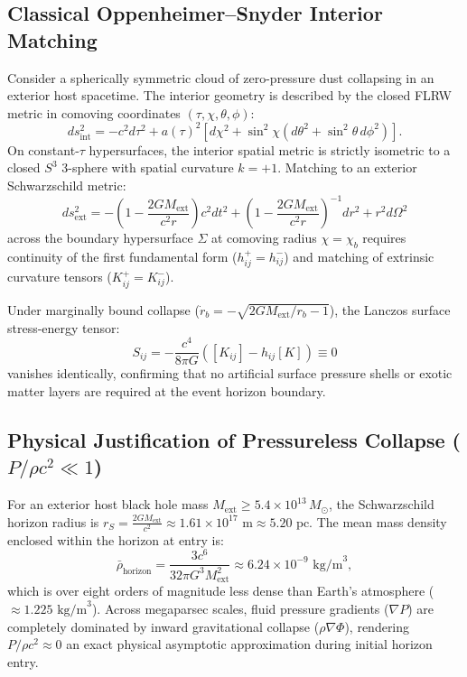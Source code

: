 \documentclass[11pt,a4paper]{article}
\theoremstyle{definition}
\begin{document}
\subsection{Classical Oppenheimer--Snyder Interior Matching}\label{sec:os_matching}
Consider a spherically symmetric cloud of zero-pressure dust collapsing in an exterior host spacetime. The interior geometry is described by the closed FLRW metric in comoving coordinates $(\tau, \chi, \theta, \phi)$:
\begin{equation}\label{eq:flrw_int}
    ds^2_{\text{int}} = -c^2 d\tau^2 + a(\tau)^2 \left[ d\chi^2 + \sin^2\chi \left( d\theta^2 + \sin^2\theta \, d\phi^2 \right) \right].
\end{equation}
On constant-$\tau$ hypersurfaces, the interior spatial metric is strictly isometric to a closed $S^3$ 3-sphere with spatial curvature $k=+1$. Matching to an exterior Schwarzschild metric:
\begin{equation}\label{eq:schwarzschild}
    ds^2_{\text{ext}} = -\left(1 - \frac{2GM_{\text{ext}}}{c^2 r}\right) c^2 dt^2 + \left(1 - \frac{2GM_{\text{ext}}}{c^2 r}\right)^{-1} dr^2 + r^2 d\Omega^2
\end{equation}
across the boundary hypersurface $\Sigma$ at comoving radius $\chi = \chi_b$ requires continuity of the first fundamental form ($h_{ij}^+ = h_{ij}^-$) and matching of extrinsic curvature tensors ($K_{ij}^+ = K_{ij}^-$).

Under marginally bound collapse ($\dot{r}_b = -\sqrt{2GM_{\text{ext}}/r_b - 1}$), the Lanczos surface stress-energy tensor:
\begin{equation}\label{eq:lanczos}
    S_{ij} = -\frac{c^4}{8\pi G} \left( [K_{ij}] - h_{ij} [K] \right) \equiv 0
\end{equation}
vanishes identically, confirming that no artificial surface pressure shells or exotic matter layers are required at the event horizon boundary.

\subsection{Physical Justification of Pressureless Collapse ($P/\rho c^2 \ll 1$)}\label{sec:dust_justification}
For an exterior host black hole mass $M_{\text{ext}} \ge 5.4 \times 10^{13} \, M_\odot$, the Schwarzschild horizon radius is $r_S = \frac{2GM_{\text{ext}}}{c^2} \approx 1.61 \times 10^{17} \text{ m} \approx 5.20 \text{ pc}$. The mean mass density enclosed within the horizon at entry is:
\begin{equation}\label{eq:horizon_density}
    \bar{\rho}_{\text{horizon}} = \frac{3 c^6}{32\pi G^3 M_{\text{ext}}^2} \approx 6.24 \times 10^{-9} \text{ kg/m}^3,
\end{equation}
which is over eight orders of magnitude less dense than Earth's atmosphere ($\approx 1.225 \text{ kg/m}^3$). Across megaparsec scales, fluid pressure gradients ($\nabla P$) are completely dominated by inward gravitational collapse ($\rho \nabla \Phi$), rendering $P/\rho c^2 \approx 0$ an exact physical asymptotic approximation during initial horizon entry.
\end{document}
